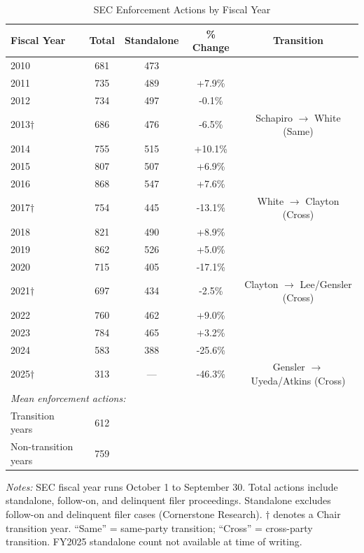 \begin{table}[t]
\centering
\caption{SEC Enforcement Actions by Fiscal Year}
\label{tab:enforcement_fy}
\small
\begin{tabular}{lcccc}
\toprule
Fiscal Year & Total & Standalone & \% Change & Transition \\
\midrule
2010 & 681 & 473 &  &  \\
2011 & 735 & 489 & +7.9\% &  \\
2012 & 734 & 497 & -0.1\% &  \\
2013$\dagger$ & 686 & 476 & -6.5\% & Schapiro $\rightarrow$ White (Same) \\
2014 & 755 & 515 & +10.1\% &  \\
2015 & 807 & 507 & +6.9\% &  \\
2016 & 868 & 547 & +7.6\% &  \\
2017$\dagger$ & 754 & 445 & -13.1\% & White $\rightarrow$ Clayton (Cross) \\
2018 & 821 & 490 & +8.9\% &  \\
2019 & 862 & 526 & +5.0\% &  \\
2020 & 715 & 405 & -17.1\% &  \\
2021$\dagger$ & 697 & 434 & -2.5\% & Clayton $\rightarrow$ Lee/Gensler (Cross) \\
2022 & 760 & 462 & +9.0\% &  \\
2023 & 784 & 465 & +3.2\% &  \\
2024 & 583 & 388 & -25.6\% &  \\
2025$\dagger$ & 313 & --- & -46.3\% & Gensler $\rightarrow$ Uyeda/Atkins (Cross) \\
\midrule
\multicolumn{5}{l}{\textit{Mean enforcement actions:}} \\
Transition years & 612 & & & \\
Non-transition years & 759 & & & \\
\bottomrule
\end{tabular}
\begin{tablenotes}
\item \textit{Notes:} SEC fiscal year runs October 1 to September 30. Total actions include standalone, follow-on, and delinquent filer proceedings. Standalone excludes follow-on and delinquent filer cases (Cornerstone Research). $\dagger$ denotes a Chair transition year. ``Same'' = same-party transition; ``Cross'' = cross-party transition. FY2025 standalone count not available at time of writing.
\end{tablenotes}
\end{table}

